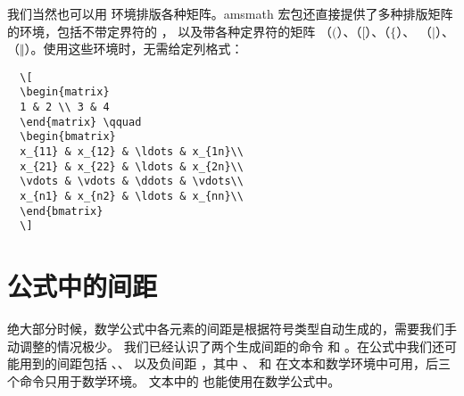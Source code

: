\begin{center}
	\fbox{
		\parbox{25em}{
			  \[ |x| =
			\begin{cases}
			-x & \text{if } x < 0,\\
			0 & \text{if } x = 0,\\
			x & \text{if } x > 0.
			\end{cases} 
			\]
		}
	}
\end{center}
我们当然也可以用  环境排版各种矩阵。amsmath 宏包还直接提供了多种排版矩阵的环境，包括不带定界符的 ，
以及带各种定界符的矩阵 （$\bigl($）、（$\bigl[$）、（$\bigl\{$）、
（$\bigl\vert$）、（$\bigl\Vert$）。使用这些环境时，无需给定列格式：
\begin{lstlisting}
  \[
  \begin{matrix}
  1 & 2 \\ 3 & 4
  \end{matrix} \qquad
  \begin{bmatrix}
  x_{11} & x_{12} & \ldots & x_{1n}\\
  x_{21} & x_{22} & \ldots & x_{2n}\\
  \vdots & \vdots & \ddots & \vdots\\
  x_{n1} & x_{n2} & \ldots & x_{nn}\\
  \end{bmatrix}
  \]
\end{lstlisting}
\begin{center}
\end{center}
\section{公式中的间距}
绝大部分时候，数学公式中各元素的间距是根据符号类型自动生成的，需要我们手动调整的情况极少。
我们已经认识了两个生成间距的命令  和 。在公式中我们还可能用到的间距包括 \cmd{,}、\cmd{:}、\cmd{;}
以及负间距 \cmd{!}，其中  、  和 \cmd{,} 在文本和数学环境中可用，后三个命令只用于数学环境。
文本中的 \cmd{\textvisiblespace} 也能使用在数学公式中。

